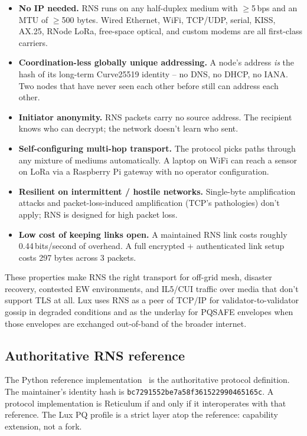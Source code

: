 \documentclass[11pt,a4paper]{article}
\begin{document}
\begin{itemize}[leftmargin=*,itemsep=0pt]
\item \textbf{No IP needed.} RNS runs on any half-duplex medium with
  $\geq$5\,bps and an MTU of $\geq$500 bytes. Wired Ethernet, WiFi,
  TCP/UDP, serial, KISS, AX.25, RNode LoRa, free-space optical, and
  custom modems are all first-class carriers.
\item \textbf{Coordination-less globally unique addressing.} A node's
  address \emph{is} the hash of its long-term Curve25519 identity --
  no DNS, no DHCP, no IANA. Two nodes that have never seen each other
  before still can address each other.
\item \textbf{Initiator anonymity.} RNS packets carry no source
  address. The recipient knows who can decrypt; the network doesn't
  learn who sent.
\item \textbf{Self-configuring multi-hop transport.} The protocol
  picks paths through any mixture of mediums automatically. A laptop
  on WiFi can reach a sensor on LoRa via a Raspberry Pi gateway with
  no operator configuration.
\item \textbf{Resilient on intermittent / hostile networks.}
  Single-byte amplification attacks and packet-loss-induced
  amplification (TCP's pathologies) don't apply; RNS is designed for
  high packet loss.
\item \textbf{Low cost of keeping links open.} A maintained RNS link
  costs roughly 0.44\,bits/second of overhead. A full encrypted +
  authenticated link setup costs 297 bytes across 3 packets.
\end{itemize}

These properties make RNS the right transport for off-grid mesh, disaster
recovery, contested EW environments, and IL5/CUI traffic over media
that don't support TLS at all. Lux uses RNS as a peer of TCP/IP for
validator-to-validator gossip in degraded conditions and as the
underlay for PQSAFE envelopes when those envelopes are exchanged
out-of-band of the broader internet.

\subsection{Authoritative RNS reference}

The Python reference implementation~\cite{rns-repo} is the
authoritative protocol definition. The maintainer's identity hash is
\texttt{bc7291552be7a58f361522990465165c}. A protocol implementation
is Reticulum if and only if it interoperates with that reference. The
Lux PQ profile is a strict layer atop the reference: capability
extension, not a fork.
\end{document}

